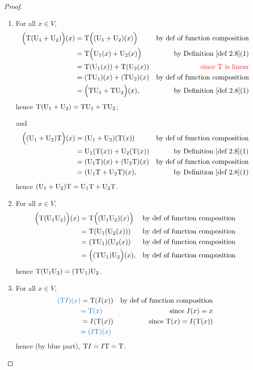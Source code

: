 \begin{proof} \ 

\begin{enumerate}
\item For all \(x \in V\),
\begin{align*}
    \Big( \T(\U_1 + \U_2) \Big)(x) & = \T \Big( (\U_1 + \U_2)(x) \Big) & \text{by def of function composition} \\
                                   & = \T\Big( \U_1(x) + \U_2(x) \Big) & \text{by \DEF{2.8}(1)} \\
                                   & = \T(\U_1(x)) + \T(\U_2(x)) & \text{\RED{since \(\T\) is linear}} \\
                                   & = (\T\U_1)(x) + (\T\U_2)(x) & \text{by def of function composition} \\
                                   & = \Big( \T\U_1 + \T\U_2 \Big)(x), & \text{by \DEF{2.8}(1)}
\end{align*}
hence \(\mathrm{T}(\mathrm{U}_1 + \mathrm{U}_2) = \mathrm{T}\mathrm{U}_1 + \mathrm{T}\mathrm{U}_2\);

and
\begin{align*}
    \Big( (\U_1 + \U_2)\T \Big)(x) & = (\U_1 + \U_2)(\T(x)) & \text{by def of function composition} \\
                                   & = \U_1(\T(x)) + \U_2(\T(x)) & \text{by \DEF{2.8}(1)} \\
                                   & = (\U_1\T)(x) + (\U_2\T)(x) & \text{by def of function composition} \\
                                   & = (\U_1\T + \U_2\T)(x), & \text{by \DEF{2.8}(1)}
\end{align*}
hence \((\mathrm{U}_1 + \mathrm{U}_2)\mathrm{T} = \mathrm{U}_1\mathrm{T} + \mathrm{U}_2\mathrm{T}\).

\item For all \(x \in V\),
\begin{align*}
    \Big( \mathrm{T}(\mathrm{U}_1\mathrm{U}_2) \Big)(x) & = \mathrm{T} \Big((\mathrm{U}_1\mathrm{U}_2)(x) \Big) & \text{by def of function composition} \\
                                & = \mathrm{T}(\mathrm{U}_1(\mathrm{U}_2(x))) & \text{by def of function composition} \\
                                & = (\mathrm{T}\mathrm{U}_1)(\mathrm{U}_2(x)) & \text{by def of function composition} \\
                                & = \Big( (\mathrm{T}\mathrm{U}_1)\mathrm{U}_2 \Big)(x), & \text{by def of function composition}
\end{align*}
hence \(\mathrm{T}(\mathrm{U}_1\mathrm{U}_2) = (\mathrm{T}\mathrm{U}_1)\mathrm{U}_2\).

\item For all \(x \in V\),
\begin{align*}
    \BLUE{(\T I)(x)} & = \T(I(x)) & \text{by def of function composition} \\
                     & \BLUE{= \T(x)} & \text{since \(I(x) = x\)} \\
                     & = I(\T(x)) & \text{since \(\T(x) = I(\T(x))\)} \\
                     & \BLUE{= (I\T)(x)}
\end{align*}
hence (by blue part), \(\mathrm{T} I = I \mathrm{T} = \mathrm{T}\).


\end{enumerate}
\end{proof}
